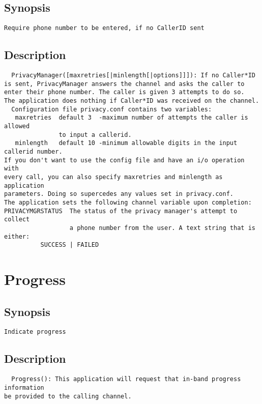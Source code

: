 \subsection{Synopsis}
\begin{verbatim}
Require phone number to be entered, if no CallerID sent
\end{verbatim}
\subsection{Description}
\begin{verbatim}
  PrivacyManager([maxretries[|minlength[|options]]]): If no Caller*ID 
is sent, PrivacyManager answers the channel and asks the caller to
enter their phone number. The caller is given 3 attempts to do so.
The application does nothing if Caller*ID was received on the channel.
  Configuration file privacy.conf contains two variables:
   maxretries  default 3  -maximum number of attempts the caller is allowed 
               to input a callerid.
   minlength   default 10 -minimum allowable digits in the input callerid number.
If you don't want to use the config file and have an i/o operation with
every call, you can also specify maxretries and minlength as application
parameters. Doing so supercedes any values set in privacy.conf.
The application sets the following channel variable upon completion: 
PRIVACYMGRSTATUS  The status of the privacy manager's attempt to collect 
                  a phone number from the user. A text string that is either:
          SUCCESS | FAILED 

\end{verbatim}


\section{Progress}
\subsection{Synopsis}
\begin{verbatim}
Indicate progress
\end{verbatim}
\subsection{Description}
\begin{verbatim}
  Progress(): This application will request that in-band progress information
be provided to the calling channel.

\end{verbatim}


